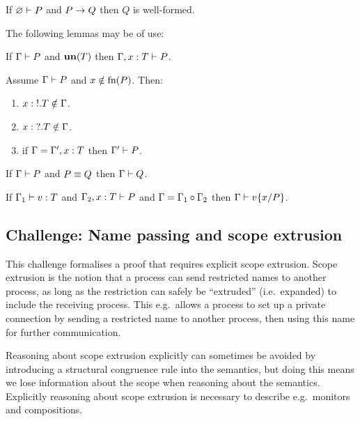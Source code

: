 \begin{corollary}
  If \( \varnothing \vdash P \) and \( P \rightarrow Q \) then \( Q \) is well-formed.
\end{corollary}

The following lemmas may be of use:
\begin{lemma}
  If \( \Gamma \vdash P \) and \( \mathbf{un}(T) \) then \( \Gamma, x : T \vdash P \).
\end{lemma}

\begin{lemma}
  Assume \( \Gamma \vdash P \) and \( x \notin \textrm{fn}(P) \).
  Then:
  \begin{enumerate}
  \item \( x : {!}.T \notin \Gamma \).
  \item \( x : {?}.T \notin \Gamma \).
  \item if \( \Gamma = \Gamma', x : T \) then \( \Gamma' \vdash P \).
  \end{enumerate}
\end{lemma}

\begin{lemma}
  If \( \Gamma \vdash P \) and \( P \equiv Q \) then \( \Gamma \vdash Q \).
\end{lemma}

\begin{lemma}
  If \( \Gamma_1 \vdash v : T \) and \( \Gamma_2, x : T \vdash P \) and \( \Gamma = \Gamma_1 \circ \Gamma_2 \) then \( \Gamma \vdash v\{x/P\} \).
\end{lemma}

\subsection{Challenge: Name passing and scope extrusion}
\label{sec:challenge:name-passing-scope-extrusion}

This challenge formalises a proof that requires explicit scope extrusion.
Scope extrusion is the notion that a process can send restricted names to another process, as long as the restriction can safely be ``extruded'' (i.e.\ expanded) to include the receiving process.
This e.g.\ allows a process to set up a private connection by sending a restricted name to another process, then using this name for further communication.

Reasoning about scope extrusion explicitly can sometimes be avoided by introducing a structural congruence rule into the semantics, but doing this means we lose information about the scope when reasoning about the semantics.
Explicitly reasoning about scope extrusion is necessary to describe e.g.\ monitors and compositions.

